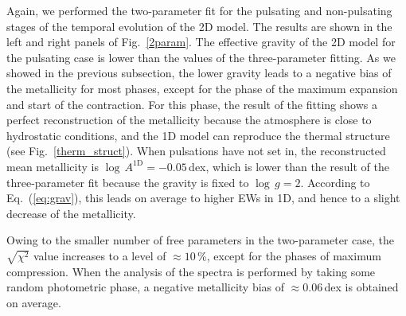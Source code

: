 \documentclass{aa}
\begin{document}
Again, we performed the two-parameter fit for the pulsating and non-pulsating
stages of the temporal evolution of the 2D model. The results are shown in the
left and right panels of Fig.~\ref{2param}.  The effective gravity of the 2D model for the pulsating case is
lower than the values of the three-parameter fitting.  As we
showed in the
previous subsection, the lower gravity leads to a negative bias of the
metallicity for most phases, except for the phase of the maximum expansion
and start of the contraction.  For this phase, the result of the fitting shows
a perfect reconstruction of the metallicity because the atmosphere is close
to hydrostatic conditions, and the 1D model can reproduce the thermal structure
(see Fig.~\ref{therm_struct}).  When pulsations have not set in,
the reconstructed mean metallicity is $\log\,A^\mathrm{1D}=-0.05$\,dex, which
is lower than the result of the three-parameter fit because the
gravity is fixed to $\log\,g=2$. According to Eq.~(\ref{eq:grav}), this leads on
average to higher EWs in 1D, and hence to a slight decrease of the metallicity.

Owing to the smaller number of free parameters in the two-parameter case, the
$\sqrt{\chi^2}$ value increases to a level of $\approx10$\,\%, except for the phases
of maximum compression.  When the analysis of the spectra is
performed by taking some
random photometric phase, a negative metallicity bias
of $\approx 0.06$\,dex is obtained on average.
\end{document}
